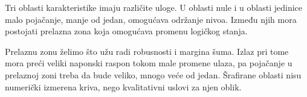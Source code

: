 Tri oblasti karakteristike imaju različite uloge. U oblasti nule i u oblasti jedinice malo pojačanje, manje od jedan, omogućava održanje nivoa. Između njih mora postojati prelazna zona koja omogućava promenu logičkog stanja.

Prelaznu zonu želimo što užu radi robusnosti i margina šuma. Izlaz pri tome mora preći veliki naponski raspon tokom male promene ulaza, pa pojačanje u prelaznoj zoni treba da bude veliko, mnogo veće od jedan. Šrafirane oblasti nisu numerički izmerena kriva, nego kvalitativni uslovi za njen oblik.
